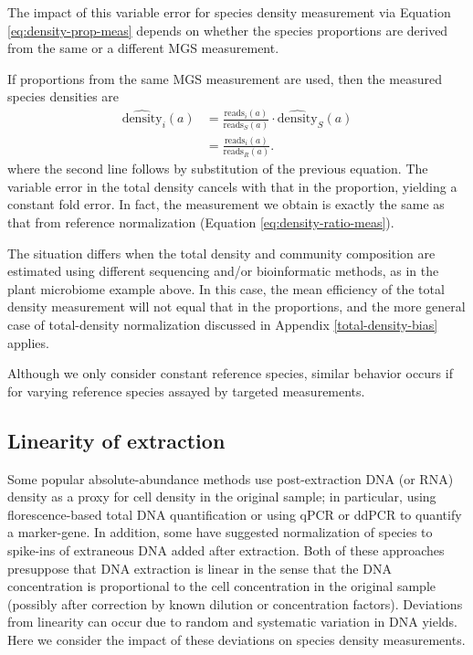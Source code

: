 \documentclass[
]{article}
\begin{document}
The impact of this variable error for species density measurement via Equation \eqref{eq:density-prop-meas} depends on whether the species proportions are derived from the same or a different MGS measurement.

If proportions from the same MGS measurement are used, then the measured species densities are
\begin{align}
  \widehat{\text{density}}_{i}(a) 
  &= \frac{\text{reads}_i(a)}{\text{reads}_{S}(a)} \cdot \widehat{\text{density}}_{S}(a)
\\&= \frac{\text{reads}_{i}(a)}{\text{reads}_{R}(a)}.
\end{align}
where the second line follows by substitution of the previous equation.
The variable error in the total density cancels with that in the proportion, yielding a constant fold error.
In fact, the measurement we obtain is exactly the same as that from reference normalization (Equation \eqref{eq:density-ratio-meas}).

The situation differs when the total density and community composition are estimated using different sequencing and/or bioinformatic methods, as in the plant microbiome example above.
In this case, the mean efficiency of the total density measurement will not equal that in the proportions, and the more general case of total-density normalization discussed in Appendix \ref{total-density-bias} applies.

Although we only consider constant reference species, similar behavior occurs if for varying reference species assayed by targeted measurements.

\hypertarget{linearity-of-extraction}{%
\subsection{Linearity of extraction}\label{linearity-of-extraction}}

Some popular absolute-abundance methods use post-extraction DNA (or RNA) density as a proxy for cell density in the original sample; in particular, using florescence-based total DNA quantification or using qPCR or ddPCR to quantify a marker-gene.
In addition, some have suggested normalization of species to spike-ins of extraneous DNA added after extraction.
Both of these approaches presuppose that DNA extraction is linear in the sense that the DNA concentration is proportional to the cell concentration in the original sample (possibly after correction by known dilution or concentration factors).
Deviations from linearity can occur due to random and systematic variation in DNA yields.
Here we consider the impact of these deviations on species density measurements.
\end{document}
